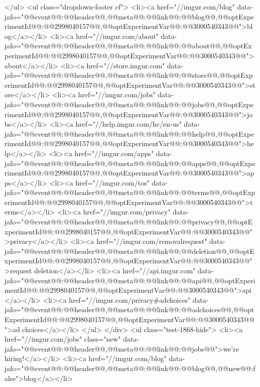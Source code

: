                             </ul>
                            <ul class="dropdown-footer cf">
                                <li><a href="//imgur.com/blog" data-jafo="{@@event@@:@@header@@,@@meta@@:{@@link@@:@@blog@@,@@optExperimentId@@:@@2998040157@@,@@optExperimentVar@@:@@3000540343@@}}">blog</a></li>
                                <li><a href="//imgur.com/about"  data-jafo="{@@event@@:@@header@@,@@meta@@:{@@link@@:@@about@@,@@optExperimentId@@:@@2998040157@@,@@optExperimentVar@@:@@3000540343@@}}">about</a></li>
                                <li><a href="//store.imgur.com" data-jafo="{@@event@@:@@header@@,@@meta@@:{@@link@@:@@store@@,@@optExperimentId@@:@@2998040157@@,@@optExperimentVar@@:@@3000540343@@}}">store</a></li>
                                <li><a href="//imgur.com/jobs"  data-jafo="{@@event@@:@@header@@,@@meta@@:{@@link@@:@@jobs@@,@@optExperimentId@@:@@2998040157@@,@@optExperimentVar@@:@@3000540343@@}}">jobs</a></li>
                                <li><a href="//help.imgur.com/hc/en-us" data-jafo="{@@event@@:@@header@@,@@meta@@:{@@link@@:@@help@@,@@optExperimentId@@:@@2998040157@@,@@optExperimentVar@@:@@3000540343@@}}">help</a></li>
                                <li><a href="//imgur.com/apps"  data-jafo="{@@event@@:@@header@@,@@meta@@:{@@link@@:@@apps@@,@@optExperimentId@@:@@2998040157@@,@@optExperimentVar@@:@@3000540343@@}}">apps</a></li>
                                <li><a href="//imgur.com/tos"  data-jafo="{@@event@@:@@header@@,@@meta@@:{@@link@@:@@terms@@,@@optExperimentId@@:@@2998040157@@,@@optExperimentVar@@:@@3000540343@@}}">terms</a></li>
                                <li><a href="//imgur.com/privacy"  data-jafo="{@@event@@:@@header@@,@@meta@@:{@@link@@:@@privacy@@,@@optExperimentId@@:@@2998040157@@,@@optExperimentVar@@:@@3000540343@@}}">privacy</a></li>
                                <li><a href="//imgur.com/removalrequest" data-jafo="{@@event@@:@@header@@,@@meta@@:{@@link@@:@@deletion@@,@@optExperimentId@@:@@2998040157@@,@@optExperimentVar@@:@@3000540343@@}}">request deletion</a></li>
                                <li><a href="//api.imgur.com" data-jafo="{@@event@@:@@header@@,@@meta@@:{@@link@@:@@api@@,@@optExperimentId@@:@@2998040157@@,@@optExperimentVar@@:@@3000540343@@}}">api</a></li>
                                <li><a href="//imgur.com/privacy#adchoices" data-jafo="{@@event@@:@@header@@,@@meta@@:{@@link@@:@@adchoices@@,@@optExperimentId@@:@@2998040157@@,@@optExperimentVar@@:@@3000540343@@}}">ad choices</a></li>
                            </ul>
                        </div>
                        <ul class="test-1868-hide">
                            <li><a href="//imgur.com/jobs" class="new" data-jafo="{@@event@@:@@header@@,@@meta@@:{@@link@@:@@jobs@@}}">we're hiring!</a></li>
                                                            <li><a href="//imgur.com/blog" data-jafo="{@@event@@:@@header@@,@@meta@@:{@@link@@:@@blog@@,@@new@@:false}}">blog</a></li>
                            
